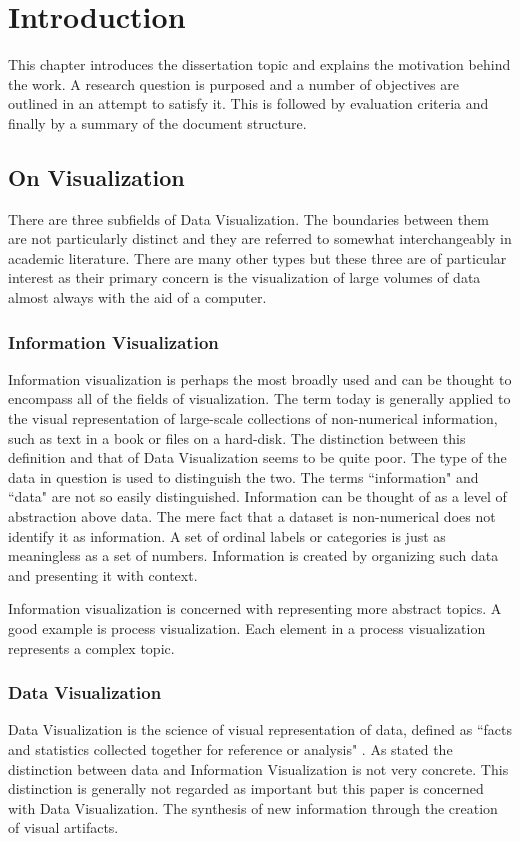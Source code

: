 \documentclass[a4paper, 11pt, titlepage, onehalfspacing]{report}
\begin{document}
\tableofcontents
\clearpage

\newpage
 
\chapter{Introduction} 
This chapter introduces the dissertation topic and explains the motivation behind the work. A research question is purposed and a number of objectives are outlined in an attempt to satisfy it. This is followed by evaluation criteria and finally by a summary of the document structure.

\section{On Visualization}
There are three subfields of Data Visualization. The boundaries between them are not particularly distinct and they are referred to somewhat interchangeably in academic literature. There are many other types but these three are of particular interest as their primary concern is the visualization of large volumes of data almost always with the aid of a computer.
\subsection{Information Visualization}
Information visualization is perhaps the most broadly used and can be thought to encompass all of the fields of visualization. The term today is generally applied to the visual representation of large-scale collections of non-numerical information, such as text in a book or files on a hard-disk. The distinction between this definition and that of Data Visualization seems to be quite poor. The type of the data in question is used to distinguish the two. The terms ``information" and ``data" are not so easily distinguished. Information can be thought of as a level of abstraction above data. The mere fact that a dataset is non-numerical does not identify it as information. A set of ordinal labels or categories is just as meaningless as a set of numbers. Information is created by organizing such data and presenting it with context.

Information visualization is concerned with representing more abstract topics. A good example is process visualization. Each element in a process visualization represents a complex topic.

\subsection{Data Visualization}
Data Visualization is the science of visual representation of data, defined as ``facts and statistics collected together for reference or analysis" \cite{oed31}. As stated the distinction between data and Information Visualization is not very concrete. This distinction is generally not regarded as important but this paper is concerned with Data Visualization. The synthesis of new information through the creation of visual artifacts.
\end{document}
